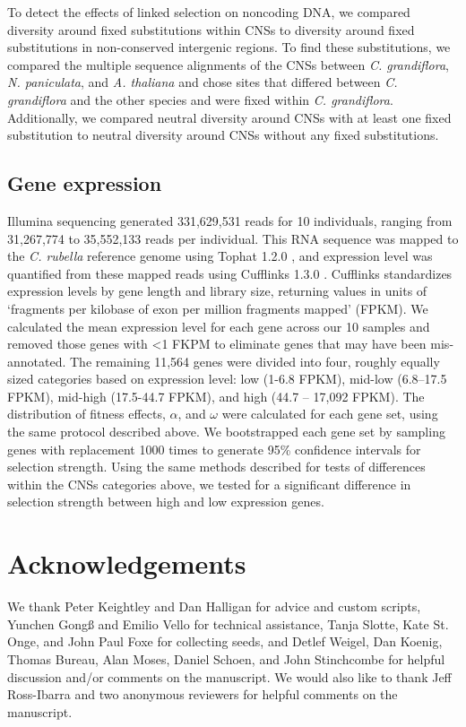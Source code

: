 To detect the effects of linked selection on noncoding DNA, we compared diversity around fixed substitutions within CNSs to diversity around fixed substitutions in non-conserved intergenic regions. To find these substitutions, we compared the multiple sequence alignments of the CNSs between \textit{C. grandiflora}, \textit{N. paniculata}, and \textit{A. thaliana} and chose sites that differed between \textit{C. grandiflora} and the other species and were fixed within \textit{C. grandiflora}. Additionally, we compared neutral diversity around CNSs with at least one fixed substitution to neutral diversity around CNSs without any fixed substitutions. 

\subsection{Gene expression}
	Illumina sequencing generated 331,629,531 reads for 10 individuals, ranging from 31,267,774 to 35,552,133 reads per individual. This RNA sequence was mapped to the \textit{C. rubella} reference genome using Tophat 1.2.0 \citep{tophat}, and expression level was quantified from these mapped reads using Cufflinks 1.3.0 \citep{cufflinks}. Cufflinks standardizes expression levels by gene length and library size, returning values in units of `fragments per kilobase of exon per million fragments mapped' (FPKM). We calculated the mean expression level for each gene across our 10 samples and removed those genes with \textless 1 FKPM to eliminate genes that may have been mis-annotated. The remaining 11,564 genes were divided into four, roughly equally sized categories based on expression level: low (1-6.8 FPKM), mid-low (6.8–17.5 FPKM), mid-high (17.5-44.7 FPKM), and high (44.7 – 17,092 FPKM). The distribution of fitness effects, $\alpha$, and $\omega$ were calculated for each gene set, using the same protocol described above. We bootstrapped each gene set by sampling genes with replacement 1000 times to generate 95\% confidence intervals for selection strength. Using the same methods described for tests of differences within the CNSs categories above, we tested for a significant difference in selection strength between high and low expression genes.

\section{Acknowledgements}
We thank Peter Keightley and Dan Halligan for advice and custom scripts, Yunchen Gongß and Emilio Vello for technical assistance, Tanja Slotte, Kate St. Onge, and John Paul Foxe for collecting seeds, and Detlef Weigel, Dan Koenig, Thomas Bureau, Alan Moses, Daniel Schoen, and John Stinchcombe for helpful discussion and/or comments on the manuscript. We would also like to thank Jeff Ross-Ibarra and two anonymous reviewers for helpful comments on the manuscript.

